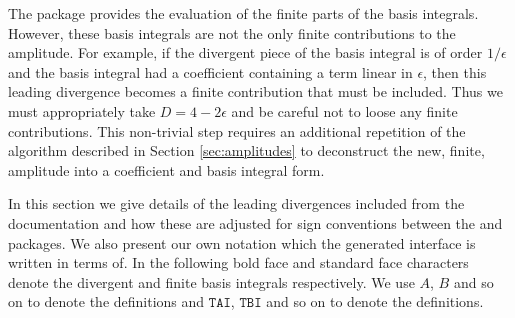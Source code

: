 The \tsil package provides the evaluation of the finite parts of the basis integrals.  However, these basis integrals are not the only finite contributions to the amplitude.  For example, if the divergent piece of the basis integral is of order $1/\epsilon$ and the basis integral had a coefficient containing a term linear in $\epsilon$, then this leading divergence becomes a finite contribution that must be included.  Thus we must appropriately take $D=4-2\epsilon$ and be careful not to loose any finite contributions.  This non-trivial step requires an additional repetition of the algorithm described in Section \ref{sec:amplitudes} to deconstruct the new, finite, amplitude into a coefficient and basis integral form.

In this section we give details of the leading divergences included from the \tsil documentation and how these are adjusted for sign conventions between the \tarcer and \tsil packages.  We also present our own notation which the generated \tsil interface is written in terms of.  In the following bold face and standard face characters denote the divergent and finite basis integrals respectively.  We use $A$, $B$ and so on to denote the \tsil definitions and $\mathtt{TAI}$, $\mathtt{TBI}$ and so on to denote the \tarcer definitions.  


